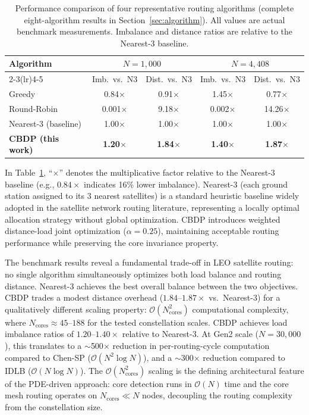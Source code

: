 \documentclass[sn-nature,pdflatex]{sn-jnl}
\begin{document}
\begin{table}[htbp]
\centering
\caption{Performance comparison of four representative routing algorithms (complete eight-algorithm results in Section~\ref{sec:algorithm}). All values are actual benchmark measurements. Imbalance and distance ratios are relative to the Nearest-3 baseline.}
\label{tab:performance_comparison}
\begin{tabular}{lcccc}
\toprule
\multirow{2}{*}{Algorithm} & \multicolumn{2}{c}{$N=1,000$} & \multicolumn{2}{c}{$N=4,408$} \\
\cmidrule(lr){2-3}\cmidrule(lr){4-5}
 & Imb.\ vs.\ N3 & Dist.\ vs.\ N3 & Imb.\ vs.\ N3 & Dist.\ vs.\ N3 \\
\midrule
Greedy & 0.84$\times$ & 0.91$\times$ & 1.45$\times$ & 0.77$\times$ \\
Round-Robin & 0.001$\times$ & 9.18$\times$ & 0.002$\times$ & 14.26$\times$ \\
Nearest-3 (baseline) & 1.00$\times$ & 1.00$\times$ & 1.00$\times$ & 1.00$\times$ \\
\textbf{CBDP (this work)} & \textbf{1.20$\times$} & \textbf{1.84$\times$} & \textbf{1.40$\times$} & \textbf{1.87$\times$} \\
\bottomrule
\end{tabular}
\end{table}

In Table~\ref{tab:performance_comparison}, ``$\times$'' denotes the multiplicative factor relative to the Nearest-3 baseline (e.g., $0.84\times$ indicates 16\% lower imbalance). Nearest-3 (each ground station assigned to its 3 nearest satellites) is a standard heuristic baseline widely adopted in the satellite network routing literature, representing a locally optimal allocation strategy without global optimization. CBDP introduces weighted distance-load joint optimization ($\alpha=0.25$), maintaining acceptable routing performance while preserving the core invariance property.

The benchmark results reveal a fundamental trade-off in LEO satellite routing: no single algorithm simultaneously optimizes both load balance and routing distance. Nearest-3 achieves the best overall balance between the two objectives. CBDP trades a modest distance overhead ($1.84$--$1.87\times$ vs.\ Nearest-3) for a qualitatively different scaling property: $\mathcal{O}(N_{\text{cores}}^2)$ computational complexity, where $N_{\text{cores}} \approx 45$--$188$ for the tested constellation scales. CBDP achieves load imbalance ratios of $1.20$--$1.40\times$ relative to Nearest-3. At Gen2 scale ($N=30,000$), this translates to a $\sim$500$\times$ reduction in per-routing-cycle computation compared to Chen-SP ($\mathcal{O}(N^2\log N)$), and a $\sim$300$\times$ reduction compared to IDLB ($\mathcal{O}(N\log N)$). The $\mathcal{O}(N_{\text{cores}}^2)$ scaling is the defining architectural feature of the PDE-driven approach: core detection runs in $\mathcal{O}(N)$ time and the core mesh routing operates on $N_{\text{cores}} \ll N$ nodes, decoupling the routing complexity from the constellation size.
\end{document}
